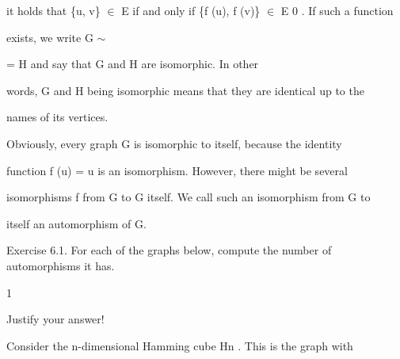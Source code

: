 \documentclass[a4paper,portrait,12pt]{article}
\begin{document}
\begin{flushleft}
it holds that \{u, v\} $\in$ E if and only if \{f (u), f (v)\} $\in$ E 0 . If such a function
\end{flushleft}


\begin{flushleft}
exists, we write G $\sim$
\end{flushleft}


\begin{flushleft}
= H and say that G and H are isomorphic. In other
\end{flushleft}


\begin{flushleft}
words, G and H being isomorphic means that they are identical up to the
\end{flushleft}


\begin{flushleft}
names of its vertices.
\end{flushleft}


\begin{flushleft}
Obviously, every graph G is isomorphic to itself, because the identity
\end{flushleft}


\begin{flushleft}
function f (u) = u is an isomorphism. However, there might be several
\end{flushleft}


\begin{flushleft}
isomorphisms f from G to G itself. We call such an isomorphism from G to
\end{flushleft}


\begin{flushleft}
itself an automorphism of G.
\end{flushleft}


\begin{flushleft}
Exercise 6.1. For each of the graphs below, compute the number of automorphisms it has.
\end{flushleft}


1





\begin{flushleft}
\newpage
Justify your answer!
\end{flushleft}


\begin{flushleft}
Consider the n-dimensional Hamming cube Hn . This is the graph with
\end{flushleft}
\end{document}

